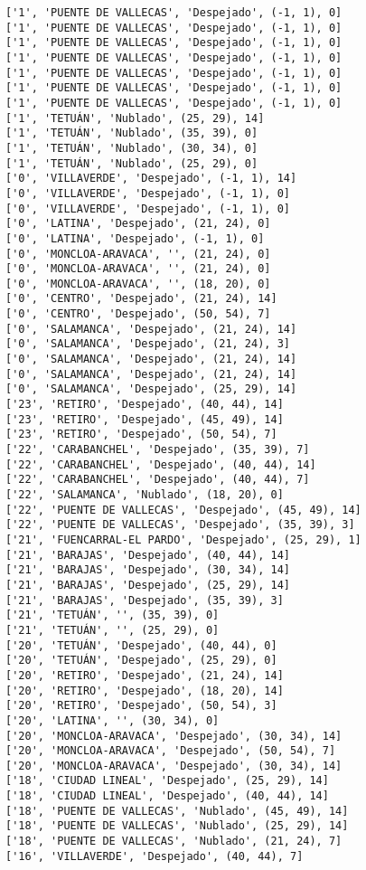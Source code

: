 \documentclass[11pt]{article}
\begin{document}
\begin{Verbatim}[commandchars=\\\{\}]
['1', 'PUENTE DE VALLECAS', 'Despejado', (-1, 1), 0]
['1', 'PUENTE DE VALLECAS', 'Despejado', (-1, 1), 0]
['1', 'PUENTE DE VALLECAS', 'Despejado', (-1, 1), 0]
['1', 'PUENTE DE VALLECAS', 'Despejado', (-1, 1), 0]
['1', 'PUENTE DE VALLECAS', 'Despejado', (-1, 1), 0]
['1', 'PUENTE DE VALLECAS', 'Despejado', (-1, 1), 0]
['1', 'PUENTE DE VALLECAS', 'Despejado', (-1, 1), 0]
['1', 'TETUÁN', 'Nublado', (25, 29), 14]
['1', 'TETUÁN', 'Nublado', (35, 39), 0]
['1', 'TETUÁN', 'Nublado', (30, 34), 0]
['1', 'TETUÁN', 'Nublado', (25, 29), 0]
['0', 'VILLAVERDE', 'Despejado', (-1, 1), 14]
['0', 'VILLAVERDE', 'Despejado', (-1, 1), 0]
['0', 'VILLAVERDE', 'Despejado', (-1, 1), 0]
['0', 'LATINA', 'Despejado', (21, 24), 0]
['0', 'LATINA', 'Despejado', (-1, 1), 0]
['0', 'MONCLOA-ARAVACA', '', (21, 24), 0]
['0', 'MONCLOA-ARAVACA', '', (21, 24), 0]
['0', 'MONCLOA-ARAVACA', '', (18, 20), 0]
['0', 'CENTRO', 'Despejado', (21, 24), 14]
['0', 'CENTRO', 'Despejado', (50, 54), 7]
['0', 'SALAMANCA', 'Despejado', (21, 24), 14]
['0', 'SALAMANCA', 'Despejado', (21, 24), 3]
['0', 'SALAMANCA', 'Despejado', (21, 24), 14]
['0', 'SALAMANCA', 'Despejado', (21, 24), 14]
['0', 'SALAMANCA', 'Despejado', (25, 29), 14]
['23', 'RETIRO', 'Despejado', (40, 44), 14]
['23', 'RETIRO', 'Despejado', (45, 49), 14]
['23', 'RETIRO', 'Despejado', (50, 54), 7]
['22', 'CARABANCHEL', 'Despejado', (35, 39), 7]
['22', 'CARABANCHEL', 'Despejado', (40, 44), 14]
['22', 'CARABANCHEL', 'Despejado', (40, 44), 7]
['22', 'SALAMANCA', 'Nublado', (18, 20), 0]
['22', 'PUENTE DE VALLECAS', 'Despejado', (45, 49), 14]
['22', 'PUENTE DE VALLECAS', 'Despejado', (35, 39), 3]
['21', 'FUENCARRAL-EL PARDO', 'Despejado', (25, 29), 1]
['21', 'BARAJAS', 'Despejado', (40, 44), 14]
['21', 'BARAJAS', 'Despejado', (30, 34), 14]
['21', 'BARAJAS', 'Despejado', (25, 29), 14]
['21', 'BARAJAS', 'Despejado', (35, 39), 3]
['21', 'TETUÁN', '', (35, 39), 0]
['21', 'TETUÁN', '', (25, 29), 0]
['20', 'TETUÁN', 'Despejado', (40, 44), 0]
['20', 'TETUÁN', 'Despejado', (25, 29), 0]
['20', 'RETIRO', 'Despejado', (21, 24), 14]
['20', 'RETIRO', 'Despejado', (18, 20), 14]
['20', 'RETIRO', 'Despejado', (50, 54), 3]
['20', 'LATINA', '', (30, 34), 0]
['20', 'MONCLOA-ARAVACA', 'Despejado', (30, 34), 14]
['20', 'MONCLOA-ARAVACA', 'Despejado', (50, 54), 7]
['20', 'MONCLOA-ARAVACA', 'Despejado', (30, 34), 14]
['18', 'CIUDAD LINEAL', 'Despejado', (25, 29), 14]
['18', 'CIUDAD LINEAL', 'Despejado', (40, 44), 14]
['18', 'PUENTE DE VALLECAS', 'Nublado', (45, 49), 14]
['18', 'PUENTE DE VALLECAS', 'Nublado', (25, 29), 14]
['18', 'PUENTE DE VALLECAS', 'Nublado', (21, 24), 7]
['16', 'VILLAVERDE', 'Despejado', (40, 44), 7]

\end{Verbatim}
\end{document}
